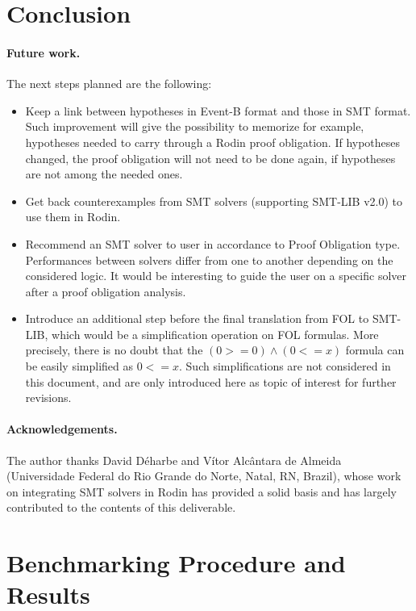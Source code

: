 \documentclass[10pt,a4paper]{report}
\begin{document}





\section{Conclusion}

\paragraph{Future work.} 
The next steps planned are the following:
\begin{itemize}
\item Keep a link between hypotheses in Event-B format and those in SMT format. 
Such improvement will give the possibility to memorize for example, hypotheses needed to carry through a Rodin proof obligation. If hypotheses changed, the proof obligation will not need to be done again, if hypotheses are not among the needed ones. 
\item Get back counterexamples from SMT solvers (supporting SMT-LIB v2.0) to use them in 
Rodin.
\item Recommend an SMT solver to user in accordance to Proof Obligation type. Performances 
between solvers differ from one to another depending on the considered logic. It would be interesting to 
guide the user on a specific solver after a proof obligation analysis.  
\item Introduce an additional step before the final translation from FOL to SMT-LIB, 
which would be a simplification operation on FOL formulas. More precisely, there 
is no doubt that the $(0 >= 0) \wedge (0 <= x)$ formula can be easily simplified as 
$0 <= x$. Such simplifications are not considered in this document, and are only 
introduced here as topic of interest for further revisions.

\end{itemize}

\paragraph{Acknowledgements.} 
The author thanks David D\'eharbe and V\'itor Alc\^antara de Almeida (Universidade Federal do Rio Grande do Norte, Natal, RN, Brazil), whose work on integrating SMT solvers in Rodin \cite{RODINSMT10} has provided a solid basis and has largely contributed to the contents of this deliverable.

\nocite{*}



\appendix
\makeatletter
\def\@seccntformat#1{Appendix~\csname the#1\endcsname:\quad}
\makeatother
\section{Benchmarking Procedure and Results}
\label{Bench}

     
\end{document}
